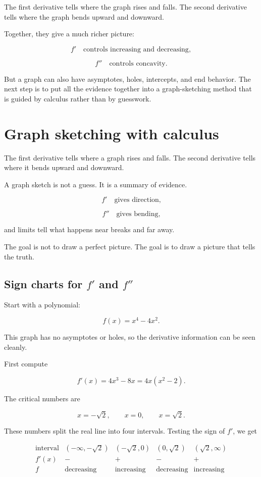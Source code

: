 The first derivative tells where the graph rises and falls.  The second derivative
tells where the graph bends upward and downward.

Together, they give a much richer picture:

\[
f' \quad\text{controls increasing and decreasing},
\]

\[
f'' \quad\text{controls concavity}.
\]

But a graph can also have asymptotes, holes, intercepts, and end behavior.  The next
step is to put all the evidence together into a graph-sketching method that is guided
by calculus rather than by guesswork.
\section{Graph sketching with calculus}
\label{sec:graph-sketching-calculus}

The first derivative tells where a graph rises and falls.  The second derivative tells
where it bends upward and downward.

A graph sketch is not a guess.  It is a summary of evidence.

\[
f' \quad\text{gives direction,}
\]

\[
f'' \quad\text{gives bending,}
\]

and limits tell what happens near breaks and far away.

The goal is not to draw a perfect picture.  The goal is to draw a picture that tells the
truth.

\subsection{Sign charts for \(f'\) and \(f''\)}
\label{subsec:sign-charts-first-second}

Start with a polynomial:

\[
f(x)=x^4-4x^2.
\]

This graph has no asymptotes or holes, so the derivative information can be seen
cleanly.

First compute

\[
f'(x)=4x^3-8x=4x(x^2-2).
\]

The critical numbers are

\[
x=-\sqrt2,\qquad x=0,\qquad x=\sqrt2.
\]

These numbers split the real line into four intervals.  Testing the sign of \(f'\), we get

\[
\begin{array}{c|cccc}
\text{interval} & (-\infty,-\sqrt2) & (-\sqrt2,0) & (0,\sqrt2) & (\sqrt2,\infty) \\ \hline
f'(x) & - & + & - & + \\
f & \text{decreasing} & \text{increasing} & \text{decreasing} & \text{increasing}
\end{array}
\]

